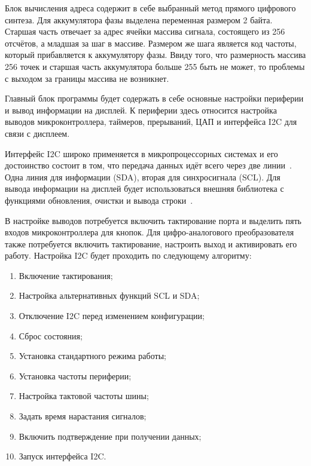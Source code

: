 	Блок вычисления адреса содержит в себе выбранный метод прямого цифрового синтеза. Для аккумулятора фазы выделена переменная размером 2 байта. Старшая часть отвечает за адрес ячейки массива сигнала, состоящего из 256 отсчётов, а младшая за шаг в массиве. Размером же шага является код частоты, который прибавляется к аккумулятору фазы. Ввиду того, что размерность массива 256 точек и старшая часть аккумулятора больше 255 быть не может, то проблемы с выходом за границы массива не возникнет.
	
	Главный блок программы будет содержать в себе основные настройки периферии и вывод информации на дисплей. К периферии здесь относится настройка выводов микроконтроллера, таймеров, прерываний, ЦАП и интерфейса I2C для связи с дисплеем. 
	
	Интерфейс I2C широко применяется в микропроцессорных системах и его достоинство состоит в том, что передача данных идёт всего через две линии~\cite{schemat}. Одна линия для информации (SDA), вторая для синхросигнала (SCL). Для вывода информации на дисплей будет использоваться внешняя библиотека с функциями обновления, очистки и вывода строки~\cite{libdisp}. 
	
	В настройке выводов потребуется включить тактирование порта и выделить пять входов микроконтроллера для кнопок. Для цифро-аналогового преобразователя также потребуется включить тактирование, настроить выход и активировать его работу. Настройка I2C будет проходить по следующему алгоритму:
	
	\begin{enumerate}
	\item Включение тактирования;
	\item Настройка альтернативных функций SCL и SDA;
	\item Отключение I2C перед изменением конфигурации;
	\item Сброс состояния;
	\item Установка стандартного режима работы;
	\item Установка частоты периферии;
	\item Настройка тактовой частоты шины;
	\item Задать время нарастания сигналов;
	\item Включить подтверждение при получении данных;
	\item Запуск интерфейса I2C.
	\end{enumerate}
	
